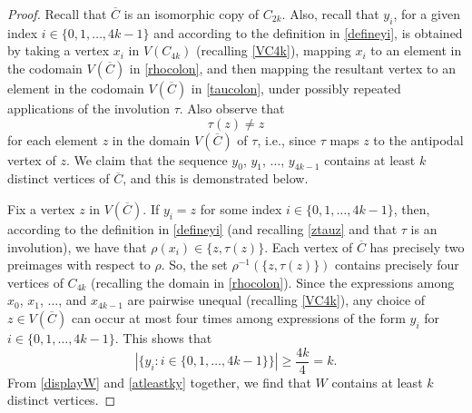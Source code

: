 \documentclass[12pt]{article}
\begin{document}
\begin{proof}
 Recall that $\overline{C}$ is an isomorphic copy of $C_{2k}$. Also, recall that $y_{i}$, for a given index $i \in \{ 0, 1, \ldots, 4 k - 1 \}$ and 
 according to the definition in \eqref{defineyi}, is obtained by taking a vertex $x_{i}$ in $V(C_{4k})$ (recalling \eqref{VC4k}), mapping 
 $x_i$ to an element in the codomain $V(\overline{C})$ in \eqref{rhocolon}, and then mapping the resultant vertex to an element in 
 the codomain $V(\overline{C})$ in \eqref{taucolon}, under possibly repeated applications of the involution $\tau$. Also observe that 
\begin{equation}\label{ztauz}
 \tau(z) \neq z
\end{equation}
 for each element $z$	 in the domain $V(\overline{C})$ of $\tau$, i.e., since $\tau$ maps $z$ to the antipodal vertex of $z$. We claim 
 that the sequence $y_{0}$, $y_{1}$, $\ldots$, $y_{4k-1}$ contains at least $k$ distinct vertices of $\overline{C}$, and this is 
 demonstrated below. 

 Fix a vertex $z$ in $V(\overline{C})$. If $y_{i} = z$ for some index $i \in \{ 0, 1, \ldots, 4 k - 1 \}$, then, according to the definition 
 in \eqref{defineyi} (and recalling \eqref{ztauz} and that $\tau$ is an involution), we have that $\rho(x_{i}) \in \{ z, \tau(z) \}$. Each vertex 
 of $\overline{C}$ has precisely two preimages with respect to $\rho$. So, the set $\rho^{-1}(\{ z, \tau(z) \})$ contains precisely four 
 vertices of $C_{4k}$ (recalling the domain in \eqref{rhocolon}). Since the expressions among $x_0$, $x_1$, $\ldots$, and $ x_{4k-1}$ 
 are pairwise unequal (recalling \eqref{VC4k}), any choice of $z \in V(\overline{C})$ can occur at most four times among expressions of 
 the form $y_{i}$ for $i \in \{ 0, 1, \ldots, 4 k - 1 \}$. This shows that 
\begin{equation}\label{atleastky}
 | \{ y_{i} : i \in \{ 0, 1, \ldots, 4 k - 1 \} \} |
 \geq \frac{4k}{4} = k. 
\end{equation}
 From \eqref{displayW} and \eqref{atleastky} together, we find that $W$ contains at 
 least $k$ distinct vertices. 


\end{proof}
\end{document}
